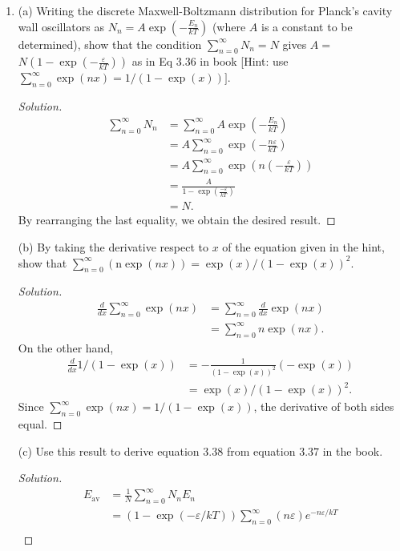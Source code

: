 \begin{enumerate}
\item 
(a) Writing the discrete Maxwell-Boltzmann distribution for Planck's cavity wall oscillators as $N_n=A \exp \left(-\frac{E_n}{k T}\right)$ (where $A$ is a constant to be determined), show that the condition $\sum_{n=0}^{\infty} N_n=N$ gives $A=$ $N\left(1-\exp \left(-\frac{\varepsilon}{k T}\right)\right)$ as in Eq $3.36$ in book [Hint: use $\sum_{n=0}^{\infty} \exp (n x)=1 /(1-\exp (x))]$. 
\begin{proof}[Solution]
	\begin{align*}
		\sum_{n=0}^{\infty} N_n
		&= \sum_{n=0}^{\infty} A \exp\left( -\frac{E_n}{kT} \right)  \\
		&= A\sum_{n=0}^{\infty}  \exp\left( -\frac{n \varepsilon}{kT} \right)  \\
		&= A\sum_{n=0}^{\infty}  \exp\left( n\left( -\frac{\varepsilon}{kT} \right)  \right)  \\
		&= \frac{A}{1 - \exp\left( \frac{-\varepsilon}{kT} \right) } \\
		&= N
	.\end{align*}
	By rearranging the last equality, we obtain the desired result.
\end{proof}
(b) By taking the derivative respect to $x$ of the equation given in the hint, show that $\sum_{n=0}^{\infty}(\mathrm{n} \exp (n x))=\exp (x) /(1-\exp (x))^2$.
\begin{proof}[Solution]
	\begin{align*}
		\frac{d}{dx} \sum_{n=0}^{\infty} \exp (n x)
		&=\sum_{n=0}^{\infty} \frac{d}{dx}  \exp (n x)\\
		&=\sum_{n=0}^{\infty} n  \exp (n x)
	.\end{align*}
	On the other hand,
	\begin{align*}
		\frac{d}{dx }1 /(1-\exp (x))
		&= - \frac{1}{\left( 1-\exp (x) \right) ^2} \left( -\exp(x) \right) \\
		&= \exp (x) /(1-\exp (x))^2
	.\end{align*}
	Since $\sum_{n=0}^{\infty} \exp (n x)=1 /(1-\exp (x))$, the derivative of both sides equal.
\end{proof}
(c) Use this result to derive equation $3.38$ from equation $3.37$ in the book. 
\begin{proof}[Solution]
	\begin{align*}
		E_{\mathrm{av}}&=\frac{1}{N} \sum_{n=0}^{\infty} N_n E_n\\
		&=\left(1-\exp(-\varepsilon / k T)\right) \sum_{n=0}^{\infty}(n \varepsilon) e^{-n \varepsilon / k T}\\

\end{align*}
\end{proof}
\end{enumerate}
